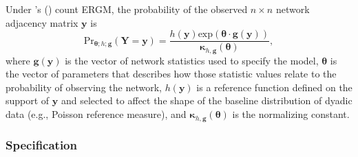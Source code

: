 \documentclass[reqno,onecolumn,letterpaper,12pt]{article}
\newcommand\citeapos[1]{\citeauthor{#1}'s (\citeyear{#1})}
\begin{document}
Under \citeapos{krivitsky2012exponential} count ERGM, the probability of the observed $n \times n$ network adjacency matrix $\bm{y}$ is
\begin{equation}
 \text{Pr}_{\bm{\theta};h;\bm{g}}( \bm{Y}=\bm{y} )=\frac{ h(\bm{y})\text{exp}( \bm {\theta} \cdot \bm{g} (\bm{y}) )}{\bm{\kappa}_{h,\bm{g}}(\bm{\theta})},
 \end{equation}
 where $\bm{g}( \bm{y} )$ is the vector of network statistics used to specify the model, $\bm{\theta}$ is the vector of parameters that describes how those statistic values relate to the probability of observing the network, $h(\bm{y})$ is a reference function defined on the support of $\bm{y}$ and selected to affect the shape of the baseline distribution of dyadic data (e.g., Poisson reference measure), and $\bm{\kappa}_{h,\bm{g}}(\bm{\theta})$ is the normalizing constant.



\subsubsection{Specification}
\end{document}
